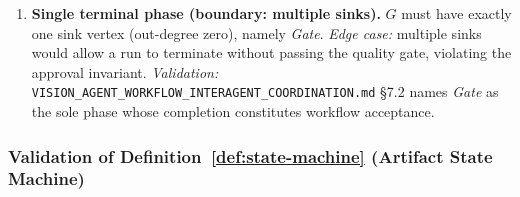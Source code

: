 \documentclass[12pt]{article}
\theoremstyle{definition}
\newcommand{\code}[1]{\texttt{#1}}
\newcommand{\VisionFlow}{\code{VISION\_AGENT\_\allowbreak WORKFLOW\_\allowbreak INTERAGENT\_\allowbreak COORDINATION.md}}
\begin{document}
\begin{enumerate}[label=\textbf{W\arabic*.}, leftmargin=*, widest=W9]
  \item \textbf{Single terminal phase (boundary: multiple sinks).}
        $G$ must have exactly one sink vertex (out-degree zero), namely
        \textit{Gate}.
        \emph{Edge case:} multiple sinks would allow a run to terminate
        without passing the quality gate, violating the approval
        invariant.
        \emph{Validation:} \VisionFlow{} \S7.2 names \textit{Gate} as
        the sole phase whose completion constitutes workflow acceptance.

\end{enumerate}

\subsubsection{Validation of Definition~\ref{def:state-machine}
               (Artifact State Machine)}
\label{sec:val-state-machine}
\end{document}
